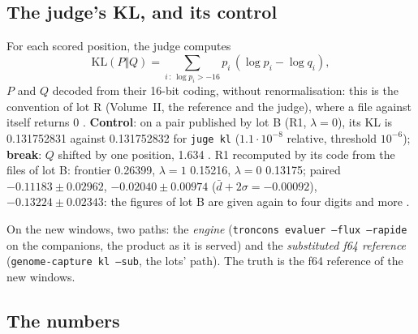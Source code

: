 \subsection{The judge's KL, and its control}\label{t3jug:sec:kljuge}

For each scored position, the judge computes
\[
\mathrm{KL}(P \Vert Q) = \sum_{i \,:\, \log p_i > -16} p_i\,(\log p_i - \log q_i),
\]
$P$ and $Q$ decoded from their 16-bit coding, without renormalisation: this is the convention of lot R (Volume~II, the reference and the judge), where a file against itself returns 0 \parencite{kullback1951}. \textbf{Control}: on a pair published by lot B (R1, $\lambda = 0$), its KL is \num{0.131752831} against \num{0.131752832} for \texttt{juge kl} ($1.1 \cdot 10^{-8}$ relative, threshold $10^{-6}$); \textbf{break}: $Q$ shifted by one position, \num{1.634} \mes. R1 recomputed by its code from the files of lot B: frontier \num{0.26399}, $\lambda = 1$ \num{0.15216}, $\lambda = 0$ \num{0.13175}; paired $-\num{0.11183} \pm \num{0.02962}$, $-\num{0.02040} \pm \num{0.00974}$ ($\bar d + 2\sigma = -\num{0.00092}$), $-\num{0.13224} \pm \num{0.02343}$: the figures of lot B are given again to four digits and more \mes.

On the new windows, two paths: the \emph{engine} (\texttt{troncons evaluer --flux --rapide} on the companions, the product as it is served) and the \emph{substituted f64 reference} (\texttt{genome-capture kl --sub}, the lots' path). The truth is the f64 reference of the new windows.

\subsection{The numbers}\label{t3jug:sec:klnombres}

